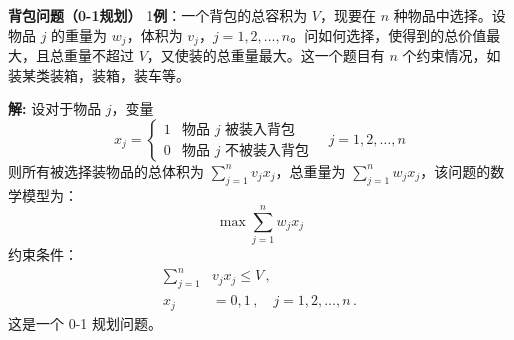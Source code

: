 \begin{exbox}{\textbf{背包问题（0-1规划）}}
    1\textbf{例}：一个背包的总容积为 $V$，现要在 $n$ 种物品中选择。设物品 $j$ 的重量为 $w_j$，体积为 $v_j$，$j=1,2,\dots,n$。问如何选择，使得到的总价值最大，且总重量不超过 $V$，又使装的总重量最大。这一个题目有 $n$ 个约束情况，如装某类装箱，装箱，装车等。
    
    \textbf{解:} 设对于物品 $j$，变量
    \[
    x_j = \begin{cases} 
        1 & \text{物品 $j$ 被装入背包} \\ 
        0 & \text{物品 $j$ 不被装入背包}
    \end{cases} \quad j=1,2,\dots,n
    \]
    则所有被选择装物品的总体积为 $\sum_{j=1}^{n} v_j x_j$，总重量为 $\sum_{j=1}^{n} w_j x_j$，该问题的数学模型为：
    \begin{equation}
        \max \sum_{j=1}^{n} w_j x_j \label{eq:obj}
    \end{equation}
    约束条件：
    \begin{align}
        \sum_{j=1}^{n}  &v_j x_j\leq V \,, \label{eq:constraint} \\
        x_j &= 0, 1 \,, \quad j=1,2,\dots,n \,. \label{eq:binary}
    \end{align}
    这是一个 0-1 规划问题。
\end{exbox}


